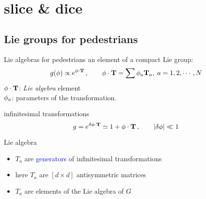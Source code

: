 \section{slice \& dice}

\subsection[Lie groups]{Lie groups for pedestrians}

\begin{frame}{Lie algebras for pedestrians}
an element of a compact Lie group:
\[
g({\bf \phi}) \propto e^{{\bf \phi} \cdot \mathbf{T} }
	\,,\qquad
{\bf \phi} \cdot \mathbf{T}  = \sum {\bf \phi}_a \mathbf{T}_a,\; a=1,2, \cdots, N
\] %
${\bf \phi} \cdot \mathbf{T}$: {\em Lie algebra} element
\\
${\bf \phi}_a$: parameters of the transformation.

\bigskip
\begin{block}{infinitesimal transformations}
\[
g=e^{\delta {\bf \phi} \cdot \mathbf{T}}
 \simeq  1 + {\bf \phi} \cdot \mathbf{T} \,, \qquad \vert \delta {\bf \phi} \vert \ll 1
\]
\end{block}
\begin{block}{Lie algebra}
\begin{itemize}
  \item $T_a$ are \textcolor{blue}{generators} of infinitesimal
transformations
  \item here $T_a$ are $[d\!\times\!d]$ antisymmetric matrices
  \item $T_a$ are elements of the Lie algebra of $G$
\end{itemize}
\end{block}
\end{frame}

